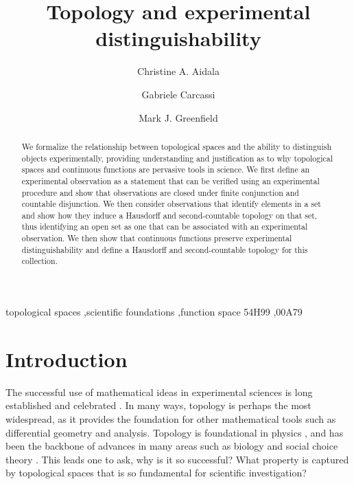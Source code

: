 \documentclass[review]{elsarticle}
\theoremstyle{plain}%
\theoremstyle{definition}
\theoremstyle{remark}
\begin{document}
\begin{frontmatter}

\title{Topology and experimental distinguishability}


\author[]{Christine A. Aidala}

\author[]{Gabriele Carcassi}

\author[]{Mark J. Greenfield}

\address{University of Michigan, Ann Arbor, MI 48109, USA}



\begin{abstract}
We formalize the relationship between topological spaces and the ability to distinguish objects experimentally, providing understanding and justification as to why topological spaces and continuous functions are pervasive tools in science. We first define an experimental observation as a statement that can be verified using an experimental procedure and show that observations are closed under finite conjunction and countable disjunction. We then consider observations that identify elements in a set and show how they induce a Hausdorff and second-countable topology on that set, thus identifying an open set as one that can be associated with an experimental observation. We then show that continuous functions preserve experimental distinguishability and define a Hausdorff and second-countable topology for this collection. 
\end{abstract}

\begin{keyword}
topological spaces \sep scientific foundations \sep function space
\MSC[2010] 54H99 \sep 00A79
\end{keyword}

\end{frontmatter}

\linenumbers

\section{Introduction}

The successful use of mathematical ideas in experimental sciences is long established and celebrated \cite{wigner}. In many ways, topology is perhaps the most widespread, as it provides the foundation for other mathematical tools such as differential geometry and analysis. Topology is foundational in physics \cite{nakahara}, and has been the backbone of advances in many areas such as biology \cite{rashevsky} and social choice theory \cite{chichilnisky}. This leads one to ask, why is it so successful? What property is captured by topological spaces that is so fundamental for scientific investigation? 
\end{document}
